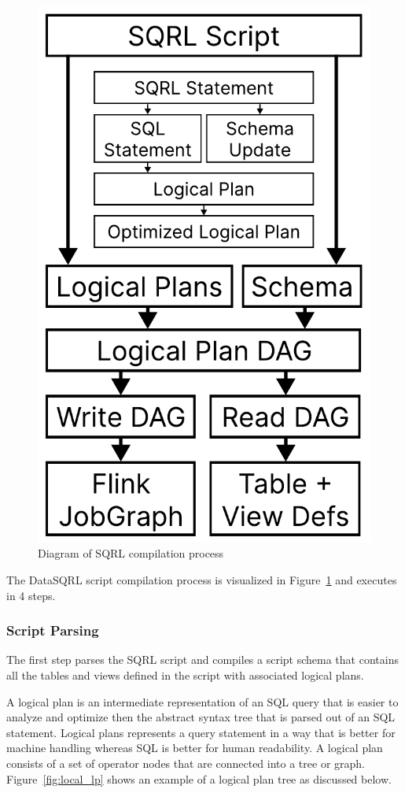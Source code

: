 \documentclass[	DIV=calc,%
							paper=letter,%
							fontsize=11pt,%
							twocolumn]{scrartcl}	 					%
\begin{document}
\begin{figure}[h]
\centering
\includegraphics[width=0.7\linewidth]{compilation.pdf}
\caption{Diagram of SQRL compilation process}
\label{fig:datasqrl_compilation}
\end{figure}

The DataSQRL script compilation process is visualized in Figure~\ref{fig:datasqrl_compilation} and executes in 4 steps.

\subsubsection{Script Parsing}

The first step parses the SQRL script and compiles a script schema that contains all the tables and views defined in the script with associated logical plans.

A logical plan is an intermediate representation of an SQL query that is easier to analyze and optimize then the abstract syntax tree that is parsed out of an SQL statement. Logical plans represents a query statement in a way that is better for machine handling whereas SQL is better for human readability. A logical plan consists of a set of operator nodes that are connected into a tree or graph. Figure~\ref{fig:local_lp} shows an example of a logical plan tree as discussed below.
\end{document}
